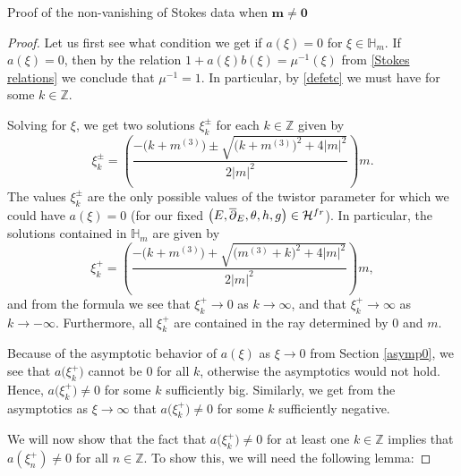\documentclass[11pt]{article}
\numberwithin{equation}{section}
\numberwithin{equation}{section}
\begin{document}
\begin{subsubsection}{Proof of the non-vanishing of Stokes data when $\boldsymbol{m\neq 0}$}
\begin{proof}
Let us first see what condition we get if $a(\xi)=0$ for $\xi \in \mathbb{H}_m$. If $a(\xi)=0$, then by the relation $1+a(\xi)b(\xi)=\mu^{-1}(\xi)$ from \eqref{Stokes relations} we conclude that $\mu^{-1}=1$. In particular, by \eqref{defetc} we must have
for some $k \in \mathbb{Z}$.

Solving for $\xi$, we get two solutions $\xi^{\pm}_k$ for each $k \in \mathbb{Z}$ given by
\begin{equation*}
 \xi_k^{\pm}=\left(\frac{-\bigl(k+m^{(3)}\bigr)\pm \sqrt{\bigl(k+m^{(3)}\bigr)^2+4|m|^2}}{2|m|^2}\right)m.
\end{equation*}
The values $\xi_k^{\pm}$ are the only possible values of the twistor parameter for which we could have $a(\xi)=0$ \big(for our fixed $\bigl(E,\overline{\partial}_E,\theta, h, g\bigr) \in \mathcal{H}^{{\rm fr}}$\big). In particular, the solutions contained in $\mathbb{H}_m$ are given by
\begin{equation*}
 \xi_k^{+}=\left(\frac{-\bigl(k+m^{(3)}\bigr)+ \sqrt{\bigl(m^{(3)}+k\bigr)^2+4|m|^2}}{2|m|^2}\right)m,
\end{equation*}
and from the formula we see that $\xi_k^{+} \to 0$ as $k\to \infty$, and that $\xi_k^{+} \to \infty$ as $k \to -\infty$. Furthermore, all $\xi_k^{+}$ are contained in the ray determined by $0$ and $m$.

Because of the asymptotic behavior of $a(\xi)$ as $\xi \to 0$ from Section \ref{asymp0}, we see that $a\bigl(\xi_k^{+}\bigr)$ cannot be $0$ for all $k$, otherwise the asymptotics would not hold. Hence, $a\bigl(\xi_k^{+}\bigr)\neq 0$ for some $k$ sufficiently big. Similarly, we get from the asymptotics as $\xi \to \infty$ that $a\bigl(\xi_k^{+}\bigr)\neq 0$ for some $k$ sufficiently negative.

We will now show that the fact that $a\bigl(\xi_k^{+}\bigr)\neq 0$ for at least one $k \in \mathbb{Z}$ implies that $a(\xi_n^{+})\neq 0$ for all $n\in \mathbb{Z}$. To show this, we will need the following lemma:


\end{proof}
\end{subsubsection}
\end{document}
